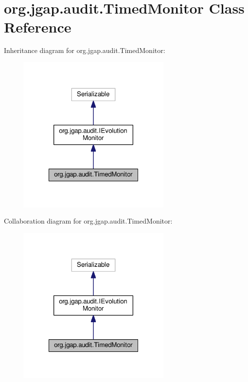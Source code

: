 \hypertarget{classorg_1_1jgap_1_1audit_1_1_timed_monitor}{\section{org.\-jgap.\-audit.\-Timed\-Monitor Class Reference}
\label{classorg_1_1jgap_1_1audit_1_1_timed_monitor}
}


Inheritance diagram for org.\-jgap.\-audit.\-Timed\-Monitor\-:
\nopagebreak
\begin{figure}[H]
\begin{center}
\leavevmode
\includegraphics[width=216pt]{classorg_1_1jgap_1_1audit_1_1_timed_monitor__inherit__graph}
\end{center}
\end{figure}


Collaboration diagram for org.\-jgap.\-audit.\-Timed\-Monitor\-:
\nopagebreak
\begin{figure}[H]
\begin{center}
\leavevmode
\includegraphics[width=216pt]{classorg_1_1jgap_1_1audit_1_1_timed_monitor__coll__graph}
\end{center}
\end{figure}
